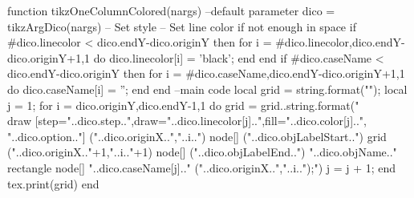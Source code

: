 \begin{luacode*}
{{{  function tikzOneColumnColored(nargs)
  --default parameter
  dico = tikzArgDico(nargs)
  -- Set style
  -- Set line color if not enough in space
  if #dico.linecolor < dico.endY-dico.originY then
  	for i = #dico.linecolor,dico.endY-dico.originY+1,1 do
		dico.linecolor[i] = 'black';
	end
  end
  if #dico.caseName < dico.endY-dico.originY then
  	for i = #dico.caseName,dico.endY-dico.originY+1,1 do
		dico.caseName[i] = '';
	end
  end
  --main code
  local grid = string.format("");
  local j = 1;
  for i = dico.originY,dico.endY-1,1 do
    grid = grid..string.format("\\draw [step="..dico.step..",draw="..dico.linecolor[j]..",fill="..dico.color[j]..", "..dico.option.."] ("..dico.originX..","..i..") node[] ("..dico.objLabelStart..") {} grid ("..dico.originX.."+1,"..i.."+1) node[] ("..dico.objLabelEnd..") {"..dico.objName.."} rectangle node[] {"..dico.caseName[j].."} ("..dico.originX..","..i..");")
    j = j + 1;
  end
	tex.print(grid)
  end

}}}
\end{luacode*}
